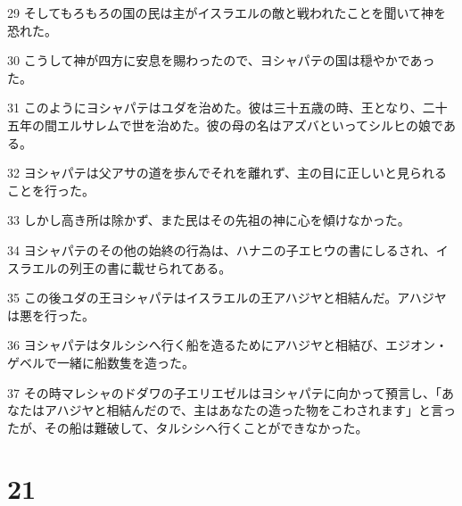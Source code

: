 \par 29 そしてもろもろの国の民は主がイスラエルの敵と戦われたことを聞いて神を恐れた。
\par 30 こうして神が四方に安息を賜わったので、ヨシャパテの国は穏やかであった。
\par 31 このようにヨシャパテはユダを治めた。彼は三十五歳の時、王となり、二十五年の間エルサレムで世を治めた。彼の母の名はアズバといってシルヒの娘である。
\par 32 ヨシャパテは父アサの道を歩んでそれを離れず、主の目に正しいと見られることを行った。
\par 33 しかし高き所は除かず、また民はその先祖の神に心を傾けなかった。
\par 34 ヨシャパテのその他の始終の行為は、ハナニの子エヒウの書にしるされ、イスラエルの列王の書に載せられてある。
\par 35 この後ユダの王ヨシャパテはイスラエルの王アハジヤと相結んだ。アハジヤは悪を行った。
\par 36 ヨシャパテはタルシシへ行く船を造るためにアハジヤと相結び、エジオン・ゲベルで一緒に船数隻を造った。
\par 37 その時マレシャのドダワの子エリエゼルはヨシャパテに向かって預言し、「あなたはアハジヤと相結んだので、主はあなたの造った物をこわされます」と言ったが、その船は難破して、タルシシへ行くことができなかった。

\chapter{21}

